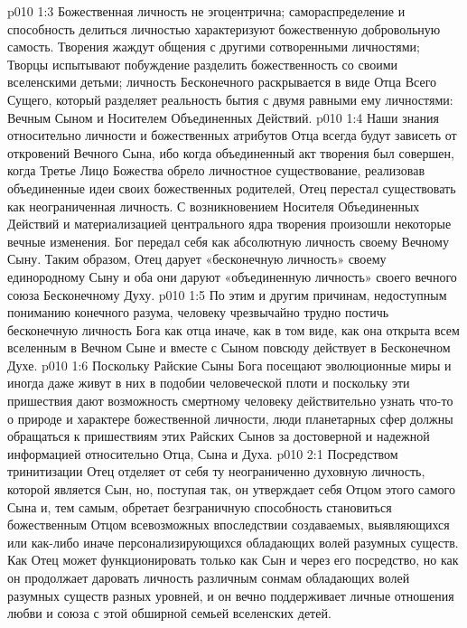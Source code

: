 \vs p010 1:3 \pc Божественная личность не эгоцентрична; самораспределение и способность делиться личностью характеризуют божественную добровольную самость. Творения жаждут общения с другими сотворенными личностями; Творцы испытывают побуждение разделить божественность со своими вселенскими детьми; личность Бесконечного раскрывается в виде Отца Всего Сущего, который разделяет реальность бытия с двумя равными ему личностями: Вечным Сыном и Носителем Объединенных Действий.
\vs p010 1:4 \pc Наши знания относительно личности и божественных атрибутов Отца всегда будут зависеть от откровений Вечного Сына, ибо когда объединенный акт творения был совершен, когда Третье Лицо Божества обрело личностное существование, реализовав объединенные идеи своих божественных родителей, Отец перестал существовать как неограниченная личность. С возникновением Носителя Объединенных Действий и материализацией центрального ядра творения произошли некоторые вечные изменения. Бог передал себя как абсолютную личность своему Вечному Сыну. Таким образом, Отец дарует «бесконечную личность» своему единородному Сыну и оба они даруют «объединенную личность» своего вечного союза Бесконечному Духу.
\vs p010 1:5 По этим и другим причинам, недоступным пониманию конечного разума, человеку чрезвычайно трудно постичь бесконечную личность Бога как отца иначе, как в том виде, как она открыта всем вселенным в Вечном Сыне и вместе с Сыном повсюду действует в Бесконечном Духе.
\vs p010 1:6 Поскольку Райские Сыны Бога посещают эволюционные миры и иногда даже живут в них в подобии человеческой плоти и поскольку эти пришествия дают возможность смертному человеку действительно узнать что\hyp{}то о природе и характере божественной личности, люди планетарных сфер должны обращаться к пришествиям этих Райских Сынов за достоверной и надежной информацией относительно Отца, Сына и Духа.
\vs p010 2:1 Посредством тринитизации Отец отделяет от себя ту неограниченно духовную личность, которой является Сын, но, поступая так, он утверждает себя Отцом этого самого Сына и, тем самым, обретает безграничную способность становиться божественным Отцом всевозможных впоследствии создаваемых, выявляющихся или как\hyp{}либо иначе персонализирующихся обладающих волей разумных существ. Как  Отец может функционировать только как Сын и через его посредство, но как  он продолжает даровать личность различным сонмам обладающих волей разумных существ разных уровней, и он вечно поддерживает личные отношения любви и союза с этой обширной семьей вселенских детей.
